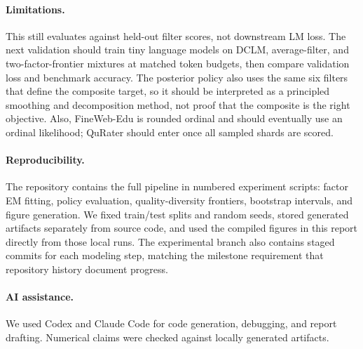 \documentclass{article}
\begin{document}
\paragraph{Limitations.}
This still evaluates against held-out filter scores, not downstream LM loss.
The next validation should train tiny language models on DCLM, average-filter,
and two-factor-frontier mixtures at matched token budgets, then compare
validation loss and benchmark accuracy. The posterior policy also uses the same
six filters that define the composite target, so it should be interpreted as a
principled smoothing and decomposition method, not proof that the composite is
the right objective. Also, FineWeb-Edu is rounded ordinal and should eventually
use an ordinal likelihood; QuRater should enter once all sampled shards are
scored.

\paragraph{Reproducibility.}
The repository contains the full pipeline in numbered experiment scripts:
factor EM fitting, policy evaluation, quality-diversity frontiers, bootstrap
intervals, and figure generation. We fixed train/test splits and random seeds,
stored generated artifacts separately from source code, and used the compiled
figures in this report directly from those local runs. The experimental branch
also contains staged commits for each modeling step, matching the milestone
requirement that repository history document progress.

\paragraph{AI assistance.}
We used Codex and Claude Code for code generation, debugging, and report
drafting. Numerical claims were checked against locally generated artifacts.
\end{document}
